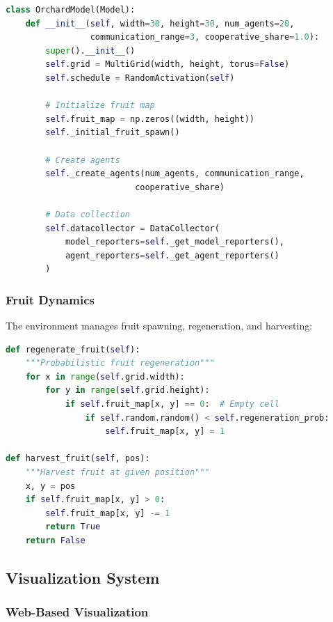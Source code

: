 \documentclass[12pt,a4paper]{article}
\begin{document}
\begin{lstlisting}[language=Python, caption=OrchardModel Structure]
class OrchardModel(Model):
    def __init__(self, width=30, height=30, num_agents=20,
                 communication_range=3, cooperative_share=1.0):
        super().__init__()
        self.grid = MultiGrid(width, height, torus=False)
        self.schedule = RandomActivation(self)

        # Initialize fruit map
        self.fruit_map = np.zeros((width, height))
        self._initial_fruit_spawn()

        # Create agents
        self._create_agents(num_agents, communication_range,
                          cooperative_share)

        # Data collection
        self.datacollector = DataCollector(
            model_reporters=self._get_model_reporters(),
            agent_reporters=self._get_agent_reporters()
        )
\end{lstlisting}

\subsubsection{Fruit Dynamics}

The environment manages fruit spawning, regeneration, and harvesting:

\begin{lstlisting}[language=Python, caption=Fruit Management System]
def regenerate_fruit(self):
    """Probabilistic fruit regeneration"""
    for x in range(self.grid.width):
        for y in range(self.grid.height):
            if self.fruit_map[x, y] == 0:  # Empty cell
                if self.random.random() < self.regeneration_prob:
                    self.fruit_map[x, y] = 1

def harvest_fruit(self, pos):
    """Harvest fruit at given position"""
    x, y = pos
    if self.fruit_map[x, y] > 0:
        self.fruit_map[x, y] -= 1
        return True
    return False
\end{lstlisting}

\subsection{Visualization System}

\subsubsection{Web-Based Visualization}
\end{document}
